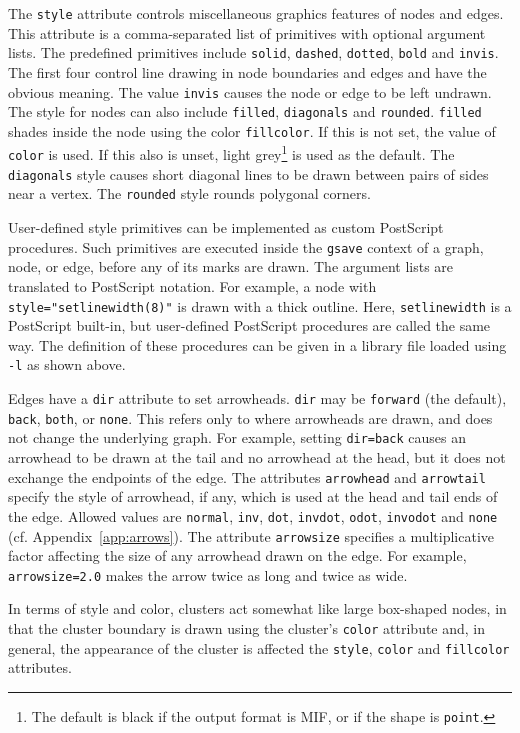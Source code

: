 \documentclass[11pt]{article}
\begin{document}
{The {\tt style} attribute controls miscellaneous graphics features of 
nodes and edges.
This attribute is a comma-separated list of primitives with 
optional argument lists.
The predefined primitives include \verb"solid", \verb"dashed", \verb"dotted",
\verb"bold" and \verb"invis".
The first four control line drawing in node boundaries and edges and
have the obvious meaning. The value {\tt invis} causes the node or edge
to be left undrawn.
The style for nodes can also include \verb"filled", 
\verb"diagonals" and \verb"rounded".
\verb"filled" shades inside the node
using the color {\tt fillcolor}. If this is not set, the value of
{\tt color} is used. If this also is unset,
light grey\footnote{The default is black if the output format is MIF,
or if the shape is {\tt point}.} is used as the default.
The \verb"diagonals" style causes short diagonal lines to be drawn
between pairs of sides near a vertex. The \verb"rounded" style rounds 
polygonal corners.

User-defined style primitives can be implemented as custom
PostScript procedures.  Such primitives are executed inside the
\verb"gsave" context of a graph, node, or edge, before any of its
marks are drawn.  The argument lists are translated to PostScript notation.
For example, a node with \verb'style="setlinewidth(8)"'  is drawn with a
thick outline.  Here, \verb"setlinewidth" is a PostScript built-in, but
user-defined PostScript procedures are called the same way.  The
definition of these procedures can be given in a library file loaded
using \verb"-l" as shown above.

Edges have a \verb"dir" attribute to set arrowheads.
\verb"dir" may be \verb"forward" (the default), \verb"back", \verb"both",
or \verb"none".  This refers only to where arrowheads are drawn, and does
not change the underlying graph.  For example, setting \verb"dir=back"
causes an arrowhead to be drawn at the tail and no arrowhead at the head,
but it does not exchange the endpoints of the edge. The attributes
{\tt arrowhead} and {\tt arrowtail} specify the style of arrowhead,
if any, which is used at the head and tail ends of the edge.
Allowed values are {\tt normal}, {\tt inv}, {\tt dot}, {\tt invdot}, 
{\tt odot}, {\tt invodot} and {\tt none} (cf. Appendix~\ref{app:arrows}).
The attribute {\tt arrowsize} specifies a multiplicative factor affecting
the size of any arrowhead drawn on the edge.
For example, {\tt arrowsize=2.0} makes the arrow twice as long and twice
as wide.

In terms of style and color, clusters act somewhat like large box-shaped
nodes, in that the cluster boundary is drawn using the cluster's
{\tt color} attribute and, in general, the appearance of the 
cluster is affected the {\tt style}, {\tt color} and {\tt fillcolor}
attributes.

}
\end{document}
